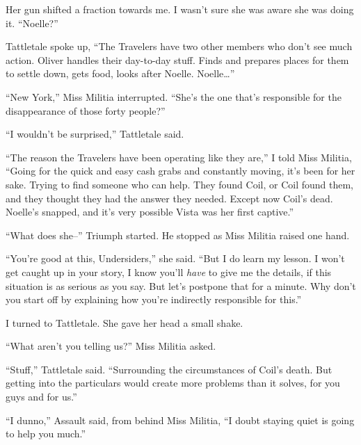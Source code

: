 Her gun shifted a fraction towards me.  I wasn't sure she was aware she was doing it. ``Noelle?''



Tattletale spoke up, ``The Travelers have two other members who don't see much action.  Oliver handles their day-to-day stuff.  Finds and prepares places for them to settle down, gets food, looks after Noelle.  Noelle\ldots''



``New York,'' Miss Militia interrupted.  ``She's the one that's responsible for the disappearance of those forty people?''



``I wouldn't be surprised,'' Tattletale said.



``The reason the Travelers have been operating like they are,'' I told Miss Militia, ``Going for the quick and easy cash grabs and constantly moving, it's been for her sake.  Trying to find someone who can help.  They found Coil, or Coil found them, and they thought they had the answer they needed.  Except now Coil's dead.  Noelle's snapped, and it's very possible Vista was her first captive.''



``What does she--'' Triumph started.  He stopped as Miss Militia raised one hand.



``You're good at this, Undersiders,'' she said.  ``But I do learn my lesson.  I won't get caught up in your story, I know you'll \emph{have} to give me the details, if this situation is as serious as you say.  But let's postpone that for a minute.  Why don't you start off by explaining how you're indirectly responsible for this.''



I turned to Tattletale.  She gave her head a small shake.



``What aren't you telling us?''  Miss Militia asked.



``Stuff,'' Tattletale said.  ``Surrounding the circumstances of Coil's death.  But getting into the particulars would create more problems than it solves, for you guys and for us.''



``I dunno,'' Assault said, from behind Miss Militia, ``I doubt staying quiet is going to help you much.''



